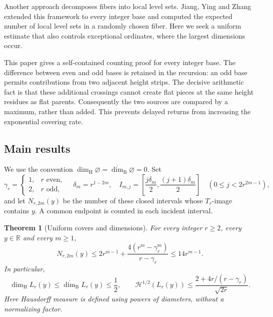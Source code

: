 \documentclass[11pt]{article}
\newtheorem{theorem}{Theorem}[section]
\theoremstyle{definition}
\theoremstyle{remark}
\newcommand{\R}{\mathbb R}
\newcommand{\dimH}{\dim_{\mathrm H}}
\newcommand{\dimB}{\overline{\dim}_{\mathrm B}}
\newcommand{\HH}{\mathcal H}
\begin{document}
Another approach decomposes fibers into local level sets. Jiang, Ying
and Zhang \cite{jiang} extended this framework to every integer base and
computed the expected number of local level sets in a randomly chosen
fiber. Here we seek a uniform estimate that also controls exceptional
ordinates, where the largest dimensions occur.

This paper gives a self-contained counting proof for every integer base.
The difference between even and odd bases is retained in the recursion:
an odd base permits contributions from two adjacent height strips.
The decisive arithmetic fact is that these additional crossings cannot
create flat pieces at the same height residues as flat parents.
Consequently the two sources are compared by a maximum, rather than added.
This prevents delayed returns from increasing the exponential covering rate.

\subsection{Main results}
We use the convention $\dimH\varnothing=\dimB\varnothing=0$.
Set
\begin{equation}\label{eq:introgrid}
 \gamma_r=\begin{cases}1,&r\text{ even},\\2,&r\text{ odd},\end{cases}
 \quad \delta_m=r^{1-2m},\quad
 I_{m,j}=\left[\frac{j\delta_m}{2},\frac{(j+1)\delta_m}{2}\right]
 \quad(0\le j<2r^{2m-1}),
\end{equation}
and let $N_{r,2m}(y)$ be the number of these closed intervals whose
$T_r$-image contains $y$. A common endpoint is counted in each incident
interval.

\begin{theorem}[Uniform covers and dimensions]\label{thm:main}
For every integer $r\ge2$, every $y\in\R$ and every $m\ge1$,
\begin{equation}\label{eq:maincover}
 N_{r,2m}(y)\le
 2r^{m-1}+\frac{4(r^m-\gamma_r^m)}{r-\gamma_r}
 \le14r^{m-1}.
\end{equation}
In particular,
\begin{equation}\label{eq:mainDim}
 \dimH L_r(y)\le\dimB L_r(y)\le\frac12,
 \qquad
 \HH^{1/2}(L_r(y))\le
 \frac{2+4r/(r-\gamma_r)}{\sqrt{2r}}.
\end{equation}
Here Hausdorff measure is defined using powers of diameters, without a
normalizing factor.
\end{theorem}
\end{document}
